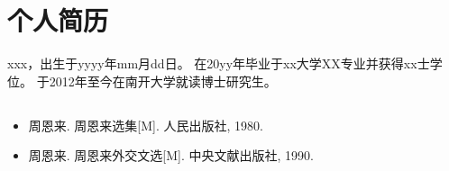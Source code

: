 
\chapter*{个人简历}


xxx，出生于yyyy年mm月dd日。
在20yy年毕业于xx大学XX专业并获得xx士学位。
于2012年至今在南开大学就读博士研究生。


\section*{}

\begin{itemize}
	\item 周恩来. 周恩来选集[M]. 人民出版社, 1980.
	\item 周恩来. 周恩来外交文选[M]. 中央文献出版社, 1990.
\end{itemize}




